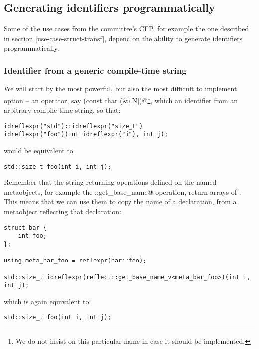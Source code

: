 \subsection{Generating identifiers programmatically}
\label{fut-ident-gen}

Some of the use cases from the committee's CFP, for example the one described
in section \ref{use-case-struct-transf}, depend on the ability to generate
identifiers programmatically.

\subsubsection{Identifier from a generic compile-time string}
\label{fut-op-identifier1}

We will start by the most powerful, but also the most difficult to implement
option -- an operator, say \verb@idreflexpr(const char (&)[N])@\footnote{We
do not insist on this particular name in case it should be implemented.},
which  an identifier from an arbitrary compile-time string, so that:

\begin{verbatim}
idreflexpr("std")::idreflexpr("size_t")
idreflexpr("foo")(int idreflexpr("i"), int j);
\end{verbatim}

would be equivalent to 

\begin{verbatim}
std::size_t foo(int i, int j);
\end{verbatim}

Remember that the string-returning operations defined on the named metaobjects,
for example the \verb@reflect::get_base_name@ operation, return \verb@constexpr@
arrays of \verb@char@s. This means that we can use them to copy the name of
a declaration, from a metaobject reflecting that declaration:

\begin{verbatim}
struct bar {
	int foo;
};

using meta_bar_foo = reflexpr(bar::foo);

std::size_t idreflexpr(reflect::get_base_name_v<meta_bar_foo>)(int i, int j);
\end{verbatim}

which is again equivalent to:

\begin{verbatim}
std::size_t foo(int i, int j);
\end{verbatim}

